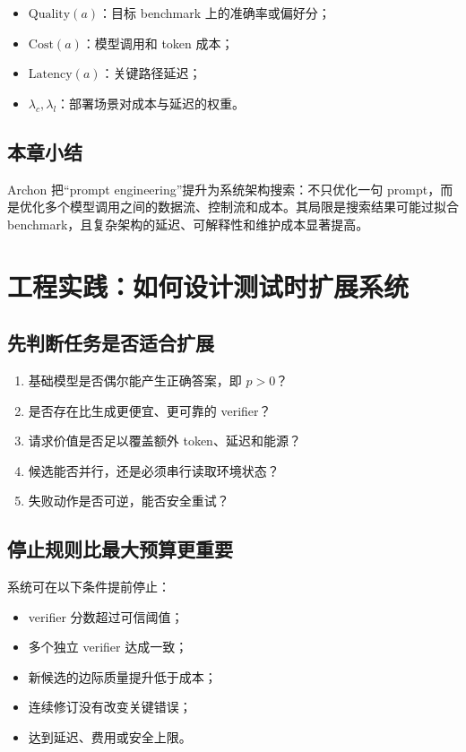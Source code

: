 \documentclass[a4paper]{article}
\begin{document}
\begin{itemize}
    \item $\mathrm{Quality}(a)$：目标 benchmark 上的准确率或偏好分；
    \item $\mathrm{Cost}(a)$：模型调用和 token 成本；
    \item $\mathrm{Latency}(a)$：关键路径延迟；
    \item $\lambda_c,\lambda_l$：部署场景对成本与延迟的权重。
\end{itemize}


\subsection{本章小结}

Archon 把“prompt engineering”提升为系统架构搜索：不只优化一句 prompt，而是优化多个模型调用之间的数据流、控制流和成本。其局限是搜索结果可能过拟合 benchmark，且复杂架构的延迟、可解释性和维护成本显著提高。

\section{工程实践：如何设计测试时扩展系统}

\subsection{先判断任务是否适合扩展}

\begin{enumerate}
    \item 基础模型是否偶尔能产生正确答案，即 $p>0$？
    \item 是否存在比生成更便宜、更可靠的 verifier？
    \item 请求价值是否足以覆盖额外 token、延迟和能源？
    \item 候选能否并行，还是必须串行读取环境状态？
    \item 失败动作是否可逆，能否安全重试？
\end{enumerate}

\subsection{停止规则比最大预算更重要}

系统可在以下条件提前停止：

\begin{itemize}
    \item verifier 分数超过可信阈值；
    \item 多个独立 verifier 达成一致；
    \item 新候选的边际质量提升低于成本；
    \item 连续修订没有改变关键错误；
    \item 达到延迟、费用或安全上限。
\end{itemize}
\end{document}
